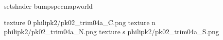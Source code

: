 setshader bumpspecmapworld

texture 0 philipk2/pk02_trim04a_C.png
texture n philipk2/pk02_trim04a_N.png
texture s philipk2/pk02_trim04a_S.png


